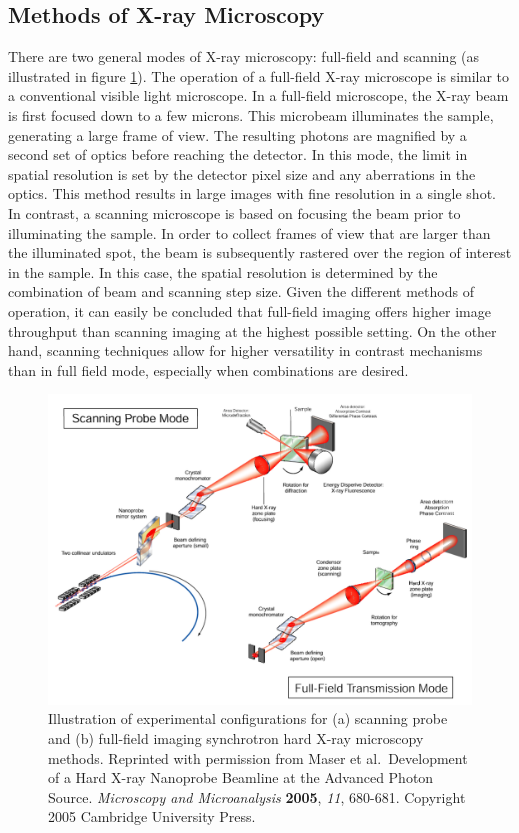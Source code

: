 \documentclass[journal=cmatex,manuscript=perspective]{achemso}
\begin{document}
\subsection{Methods of X-ray Microscopy}

There are two general modes of X-ray microscopy: full-field and
scanning (as illustrated in figure \ref{figure:maser2005}). The
operation of a full-field X-ray microscope is similar to a
conventional visible light microscope. In a full-field microscope, the
X-ray beam is first focused down to a few microns. This microbeam
illuminates the sample, generating a large frame of view. The
resulting photons are magnified by a second set of optics before
reaching the detector.  In this mode, the limit in spatial resolution
is set by the detector pixel size and any aberrations in the
optics. This method results in large images with fine resolution in a
single shot. In contrast, a scanning microscope is based on focusing
the beam prior to illuminating the sample.  In order to collect frames
of view that are larger than the illuminated spot, the beam is
subsequently rastered over the region of interest in the sample. In
this case, the spatial resolution is determined by the combination of
beam and scanning step size. Given the different methods of operation,
it can easily be concluded that full-field imaging offers higher image
throughput than scanning imaging at the highest possible setting. On
the other hand, scanning techniques allow for higher versatility in
contrast mechanisms than in full field mode, especially when
combinations are desired.

\begin{figure}
  \includegraphics[width=\textwidth]{maser2005.png}
  \caption{Illustration of experimental configurations for (a)
    scanning probe and (b) full-field imaging synchrotron hard X-ray
    microscopy methods. Reprinted with permission from Maser et
    al.\ Development of a Hard X-ray Nanoprobe Beamline at the Advanced
    Photon Source. \textit{Microscopy and Microanalysis}
    \textbf{2005}, \textit{11}, 680-681. Copyright 2005 Cambridge
    University Press.}
  \label{figure:maser2005}
\end{figure}
\end{document}
